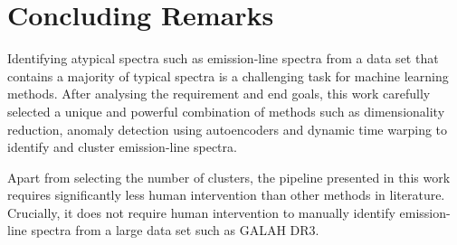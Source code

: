\section{Concluding Remarks}

Identifying atypical spectra such as emission-line spectra from a data set that contains a majority of typical spectra is a challenging task for machine learning methods. After analysing the requirement and end goals, this work carefully selected a unique and powerful combination of methods such as dimensionality reduction, anomaly detection using autoencoders and dynamic time warping to identify and cluster emission-line spectra. 

Apart from selecting the number of clusters, the pipeline presented in this work requires significantly less human intervention than other methods in literature. Crucially, it does not require human intervention to manually identify emission-line spectra from a large data set such as GALAH DR3. 







